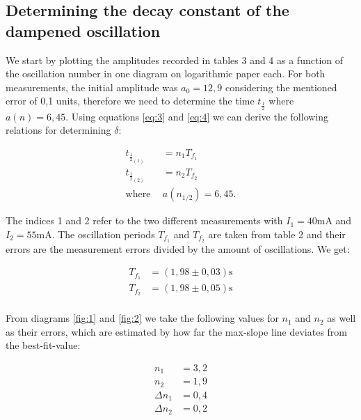 \documentclass{article}
\begin{document}
\subsection{Determining the decay constant of the dampened oscillation}

We start by plotting the amplitudes recorded in tables 3 and 4 as a function of the oscillation number in one diagram on logarithmic paper each. For both measurements, the initial amplitude was $a_0 = 12,9$ considering the mentioned error of 0,1 units, therefore we need to determine the time $t_\frac{1}{2}$ where $a(n) = 6,45$. Using equations \ref{eq:3} and \ref{eq:4} we can derive the following relations for determining $\delta$:

\begin{equation}
    \begin{split}
        t_{\frac{1}{2}_{(1)}} &= n_1 T_{f_1} \\
        t_{\frac{1}{2}_{(2)}} &= n_2 T_{f_2} \\
        \text{where} \ \ &a(n_{1/2}) = 6,45.
    \end{split}
    \label{eq:98}
\end{equation}

The indices 1 and 2 refer to the two different measurements with $I_1 = 40$mA and $I_2 = 55$mA. The oscillation periods $T_{f_1}$ and $T_{f_2}$ are taken from table 2 and their errors are the measurement errors divided by the amount of oscillations. We get:

\begin{equation}
    \begin{split}
        T_{f_1} &= (1,98 \pm 0,03) \text{s} \\
        T_{f_2} &= (1,98 \pm 0,05) \text{s} \\
    \end{split}
    \label{eq:97}
\end{equation}

From diagrams \ref{fig:1} and \ref{fig:2} we take the following values for $n_1$ and $n_2$ as well as their errors, which are estimated by how far the max-slope line deviates from the best-fit-value:

\begin{equation}
    \begin{split}
        n_1 &= 3,2 \\
        n_2 &= 1,9 \\
        \Delta n_1 &= 0,4 \\
        \Delta n_2 &= 0,2
    \end{split}
    \label{eq:96}
\end{equation}
\end{document}
